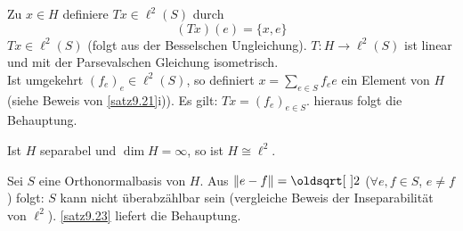 \begin{beweis}
	Zu $ x\in H $ definiere $ Tx\in\ell^2(S) $ durch
	\[ (Tx)(e)=\lbrace x,e\rbrace \]
	$ Tx\in\ell^2(S) $ (folgt aus der Besselschen Ungleichung). $ T\colon H\rightarrow\ell^2(S) $ ist linear und mit der Parsevalschen Gleichung isometrisch.\\
	Ist umgekehrt $ (f_e)_e\in\ell^2(S) $, so definiert $ x=\sum_{e\in S} f_e e $ ein Element von $ H $ (siehe Beweis von \ref{satz9.21}i)). Es gilt: $ Tx=(f_e)_{e\in S} $. hieraus folgt die Behauptung. 
\end{beweis}
\begin{korollar}
	Ist $ H $ separabel und $ \dim H=\infty $, so ist $ H\cong\ell^2 $. 
\end{korollar}
\begin{beweis}
	Sei $ S $ eine Orthonormalbasis von $ H $. Aus $ \norm{e-f}=\sqrt{2} $ ($ \forall e,f\in S $, $ e\neq f $) folgt: $ S $ kann nicht \"uberabz\"ahlbar sein (vergleiche Beweis der Inseparabilit\"at von $ \ell^2 $). \ref{satz9.23} liefert die Behauptung.
\end{beweis}